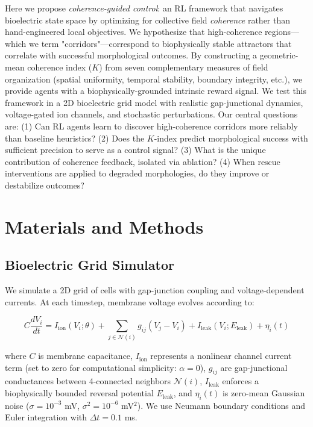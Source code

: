 \documentclass[10pt,letterpaper]{article}
\begin{document}
Here we propose \emph{coherence-guided control}: an RL framework that navigates bioelectric state space by optimizing for collective field \emph{coherence} rather than hand-engineered local objectives. We hypothesize that high-coherence regions—which we term "corridors"—correspond to biophysically stable attractors that correlate with successful morphological outcomes. By constructing a geometric-mean coherence index ($K$) from seven complementary measures of field organization (spatial uniformity, temporal stability, boundary integrity, etc.), we provide agents with a biophysically-grounded intrinsic reward signal. We test this framework in a 2D bioelectric grid model with realistic gap-junctional dynamics, voltage-gated ion channels, and stochastic perturbations. Our central questions are: (1) Can RL agents learn to discover high-coherence corridors more reliably than baseline heuristics? (2) Does the $K$-index predict morphological success with sufficient precision to serve as a control signal? (3) What is the unique contribution of coherence feedback, isolated via ablation? (4) When rescue interventions are applied to degraded morphologies, do they improve or destabilize outcomes?

\section*{Materials and Methods}

\subsection*{Bioelectric Grid Simulator}

We simulate a 2D grid of cells with gap-junction coupling and voltage-dependent currents. At each timestep, membrane voltage evolves according to:

\begin{equation}
C \frac{dV_i}{dt} = I_{\text{ion}}(V_i; \theta) + \sum_{j \in \mathcal{N}(i)} g_{ij}(V_j - V_i) + I_{\text{leak}}(V_i; E_{\text{leak}}) + \eta_i(t)
\end{equation}

where $C$ is membrane capacitance, $I_{\text{ion}}$ represents a nonlinear channel current term (set to zero for computational simplicity: $\alpha=0$), $g_{ij}$ are gap-junctional conductances between 4-connected neighbors $\mathcal{N}(i)$, $I_{\text{leak}}$ enforces a biophysically bounded reversal potential $E_{\text{leak}}$, and $\eta_i(t)$ is zero-mean Gaussian noise ($\sigma = 10^{-3}$ mV, $\sigma^2 = 10^{-6}$ mV$^2$). We use Neumann boundary conditions and Euler integration with $\Delta t = 0.1$ ms.
\end{document}
